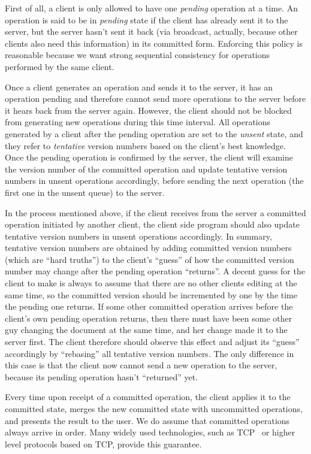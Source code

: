 First of all, a client is only allowed to have one {\em pending} operation at a
time. An operation is said to be in {\em pending} state if the client has
already sent it to the server, but the server hasn't sent it back (via
broadcast, actually, because other clients also need this information) in its
committed form. Enforcing this policy is reasonable because we want strong
sequential consistency for operations performed by the same client.

Once a client generates an operation and sends it to the server, it has an
operation pending and therefore cannot send more operations to the server before
it hears back from the server again. However, the client should not be blocked
from generating new operations during this time interval. All operations
generated by a client after the pending operation are set to the {\em unsent}
state, and they refer to {\em tentative} version numbers based on the client's
best knowledge. Once the pending operation is confirmed by the server, the
client will examine the version number of the committed operation and update
tentative version numbers in unsent operations accordingly, before sending the
next operation (the first one in the unsent queue) to the server.

In the process mentioned above, if the client receives from the server a
committed operation initiated by another client, the client side program should
also update tentative version numbers in unsent operations accordingly. In
summary, tentative version numbers are obtained by adding committed version
numbers (which are ``hard truths'') to the client's ``guess'' of how the
committed version number may change after the pending operation ``returns''. A
decent guess for the client to make is always to assume that there are no other
clients editing at the same time, so the committed version should be incremented
by one by the time the pending one returns. If some other committed operation
arrives before the client's own pending operation returns, then there must have
been some other guy changing the document at the same time, and her change made
it to the server first. The client therefore should observe this effect and
adjust its ``guess'' accordingly by ``rebasing'' all tentative version numbers.
The only difference in this case is that the client now cannot send a new
operation to the server, because its pending operation hasn't ``returned'' yet.

Every time upon receipt of a committed operation, the client applies it to the
committed state, merges the new committed state with uncommitted operations, and
presents the result to the user. We do assume that committed operations always
arrive in order. Many widely used technologies, such as TCP~\cite{tcp} or higher
level protocols based on TCP, provide this guarantee.
